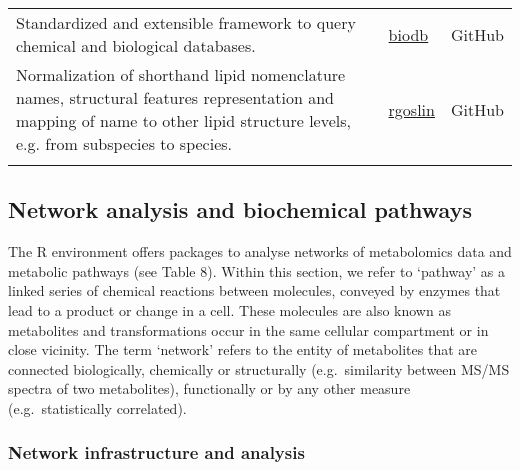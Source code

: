 \documentclass[]{article}
\begin{document}
\begin{longtable}[t]{>{\raggedright\arraybackslash}p{30em}>{\raggedright\arraybackslash}p{10em}>{\raggedright\arraybackslash}p{3em}}
Standardized and extensible framework to query chemical and biological databases. & \href{https://github.com/pkrog/biodb}{biodb} & GitHub\\
\rowcolor{gray!6}  Normalization of shorthand lipid nomenclature names, structural features representation and mapping of name to other lipid structure levels, e.g. from subspecies to species. & \href{https://github.com/lifs-tools/rgoslin}{rgoslin} & GitHub\\*
\end{longtable}

\newpage

\hypertarget{network-analysis-and-biochemical-pathways}{%
\subsection{Network analysis and biochemical pathways}\label{network-analysis-and-biochemical-pathways}}

The R environment offers packages to analyse networks of metabolomics data and metabolic pathways (see Table 8). Within this section, we refer to `pathway' as a linked series of chemical reactions between molecules, conveyed by enzymes that lead to a product or change in a cell. These molecules are also known as metabolites and transformations occur in the same cellular compartment or in close vicinity. The term `network' refers to the entity of metabolites that are connected biologically, chemically or structurally (e.g.~similarity between MS/MS spectra of two metabolites), functionally or by any other measure (e.g.~statistically correlated).

\hypertarget{network-infrastructure-and-analysis}{%
\subsubsection{Network infrastructure and analysis}\label{network-infrastructure-and-analysis}}
\end{document}
